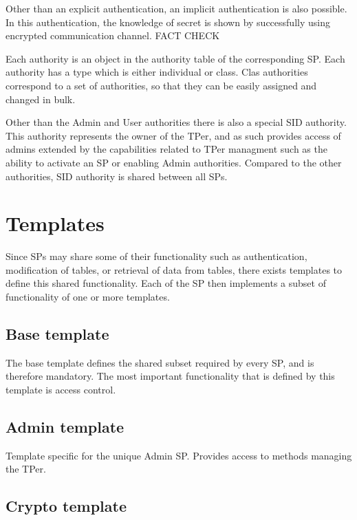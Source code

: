
Other than an explicit authentication, an implicit authentication is also possible. In this authentication, the knowledge of secret is shown by successfully using encrypted communication channel. FACT CHECK

Each authority is an object in the authority table of the corresponding SP.
Each authority has a type which is either individual or class. Clas authorities correspond to a set of authorities, so that they can be easily assigned and changed in bulk.

Other than the Admin and User authorities there is also a special SID authority. This authority represents the owner of the TPer, and as such provides access of admins extended by the capabilities related to TPer managment such as the ability to activate an SP or enabling Admin authorities. Compared to the other authorities, SID authority is shared between all SPs.

\section{Templates}

Since SPs may share some of their functionality such as authentication, modification of tables, or retrieval of data from tables, there exists templates to define this shared functionality. Each of the SP then implements a subset of functionality of one or more templates.

\subsection{Base template}

The base template defines the shared subset required by every SP, and is therefore mandatory. The most important functionality that is defined by this template is access control.

\subsection{Admin template}

Template specific for the unique Admin SP. Provides access to methods managing the TPer.

\subsection{Crypto template}


